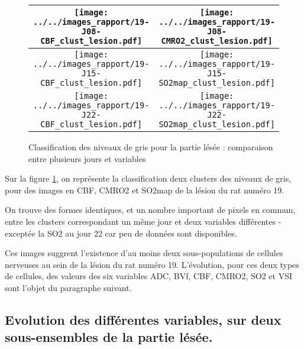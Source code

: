 \begin{figure}[!p]
\begin{center}
\begin{tabular}{|c|c|}
\hline
\texttt{[image: ../../images\_rapport/19-J08-CBF\_clust\_lesion.pdf]}
&
\texttt{[image: ../../images\_rapport/19-J08-CMRO2\_clust\_lesion.pdf]}
\\
\hline
\texttt{[image: ../../images\_rapport/19-J15-CBF\_clust\_lesion.pdf]}
&
\texttt{[image: ../../images\_rapport/19-J15-SO2map\_clust\_lesion.pdf]}
\\
\hline
\texttt{[image: ../../images\_rapport/19-J22-CBF\_clust\_lesion.pdf]}
&
\texttt{[image: ../../images\_rapport/19-J22-SO2map\_clust\_lesion.pdf]}
\\
\hline
\end{tabular}
\end{center}
\caption{Classification des niveaux de gris pour la partie l\'es\'ee : comparaison entre plusieurs jours et variables}
\label{19_reg_clust_les}
\end{figure}

Sur la figure \ref{19_reg_clust_les}, on repr\'esente la classification  deux clusters des niveaux de gris, %
pour des images en CBF, CMRO2 et SO2map de la l\'esion du rat num\'ero 19.

\par
On trouve des formes identiques, et un nombre important de pixels en commun, entre les clusters correspondant  un m\^eme jour et deux variables diff\'erentes %
-except\'ee la SO2 au jour 22 car peu de donn\'ees sont disponibles.

\par
Ces images suggrent l'existence d'au moins deux sous-populations de cellules nerveuses au sein de la l\'esion du rat num\'ero 19. %
L'\'evolution, pour ces deux types de cellules, des valeurs des six variables ADC, BVf, CBF, CMRO2, SO2 et VSI sont l'objet du paragraphe suivant.

\FloatBarrier
\subsection{Evolution des diff\'erentes variables, sur deux sous-ensembles de la partie l\'es\'ee.}%

